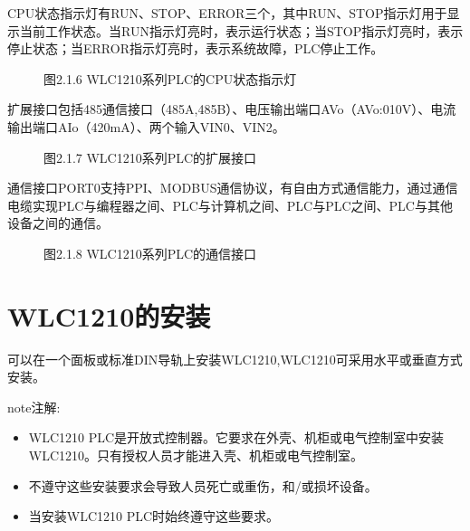 \documentclass[a4paper,10pt,english]{sphinxmanual}
\begin{document}
\sphinxAtStartPar
{}

\sphinxAtStartPar
CPU状态指示灯有RUN、STOP、ERROR三个，其中RUN、STOP指示灯用于显示当前工作状态。当RUN指示灯亮时，表示运行状态；当STOP指示灯亮时，表示停止状态；当ERROR指示灯亮时，表示系统故障，PLC停止工作。

\begin{figure}[htbp]
\centering
\capstart

\noindent{}
\caption{图2.1.6  WLC\sphinxhyphen{}1210系列PLC的CPU状态指示灯}\label{\detokenize{Product_Overview:id9}}\end{figure}

\sphinxAtStartPar
{}

\sphinxAtStartPar
扩展接口包括485通信接口（485A,485B）、电压输出端口AVo（AVo:0\sphinxhyphen{}10V）、电流输出端口AIo（4\sphinxhyphen{}20mA）、两个输入VIN0、VIN2。

\begin{figure}[htbp]
\centering
\capstart

\noindent{}
\caption{图2.1.7  WLC\sphinxhyphen{}1210系列PLC的扩展接口}\label{\detokenize{Product_Overview:id10}}\end{figure}

\sphinxAtStartPar
{}

\sphinxAtStartPar
通信接口PORT0支持PPI、MODBUS通信协议，有自由方式通信能力，通过通信电缆实现PLC与编程器之间、PLC与计算机之间、PLC与PLC之间、PLC与其他设备之间的通信。

\begin{figure}[htbp]
\centering
\capstart

\noindent{}
\caption{图2.1.8  WLC\sphinxhyphen{}1210系列PLC的通信接口}\label{\detokenize{Product_Overview:id11}}\end{figure}


\section{WLC\sphinxhyphen{}1210的安装}
\label{\detokenize{Product_Overview:id2}}
\sphinxAtStartPar
可以在一个面板或标准DIN导轨上安装WLC\sphinxhyphen{}1210,WLC\sphinxhyphen{}1210可采用水平或垂直方式安装。

\begin{sphinxadmonition}{note}{注解:}\begin{itemize}
\item {} 
\sphinxAtStartPar
WLC\sphinxhyphen{}1210 PLC是开放式控制器。它要求在外壳、机柜或电气控制室中安装WLC\sphinxhyphen{}1210。只有授权人员才能进入壳、机柜或电气控制室。

\item {} 
\sphinxAtStartPar
不遵守这些安装要求会导致人员死亡或重伤，和/或损坏设备。

\item {} 
\sphinxAtStartPar
当安装WLC\sphinxhyphen{}1210 PLC时始终遵守这些要求。

\end{itemize}
\end{sphinxadmonition}
\end{document}
